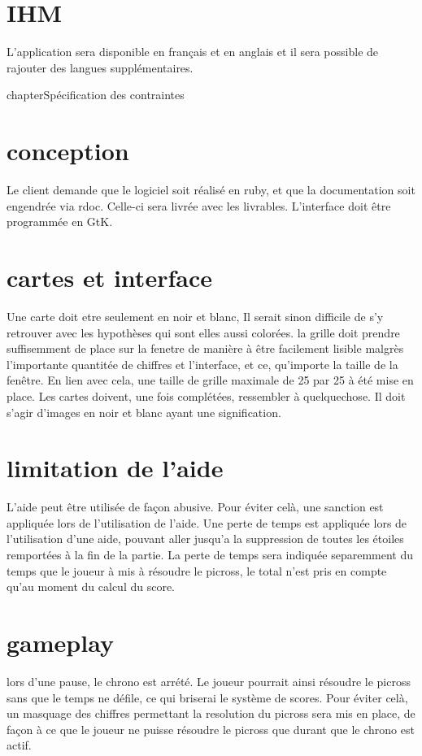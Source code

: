 \documentclass{report}
\begin{document}
			
		\section{IHM}
			L'application sera disponible en français et en anglais et il sera possible de rajouter des langues supplémentaires.
			
chapter{Spécification des contraintes}

	\section{conception}
		Le client demande que le logiciel soit réalisé en ruby, et que la documentation soit engendrée via rdoc. Celle-ci sera livrée avec les livrables. L'interface doit être programmée en GtK.
		
	\section{cartes et interface}
		Une carte doit etre seulement en noir et blanc, Il serait sinon difficile de s'y retrouver avec les hypothèses qui sont elles aussi colorées.
		la grille doit prendre suffisemment de place sur la fenetre de manière à être facilement lisible malgrès l'importante quantitée de chiffres et l'interface, et ce, qu'importe la taille de la fenêtre. En lien avec cela, une taille de grille maximale de 25 par 25 à été mise en place.
		Les cartes doivent, une fois complétées, ressembler à quelquechose. Il doit s'agir d'images en noir et blanc ayant une signification.
	
	\section{limitation de l'aide}
		L'aide peut être utilisée de façon abusive. Pour éviter celà, une sanction est appliquée lors de l'utilisation de l'aide. Une perte de temps est appliquée lors de l'utilisation d'une aide, pouvant aller jusqu'a la suppression de toutes les étoiles remportées à la fin de la partie. La perte de temps sera indiquée separemment du temps que le joueur à mis à résoudre le picross, le total n'est pris en compte qu'au moment du calcul du score.
	
	\section{gameplay}
		lors d'une pause, le chrono est arrété. Le joueur pourrait ainsi résoudre le picross sans que le temps ne défile, ce qui briserai le système de scores. Pour éviter celà, un masquage des chiffres permettant la resolution du picross sera mis en place, de façon à ce que le joueur ne puisse résoudre le picross que durant que le chrono est actif.
		
\end{document}
